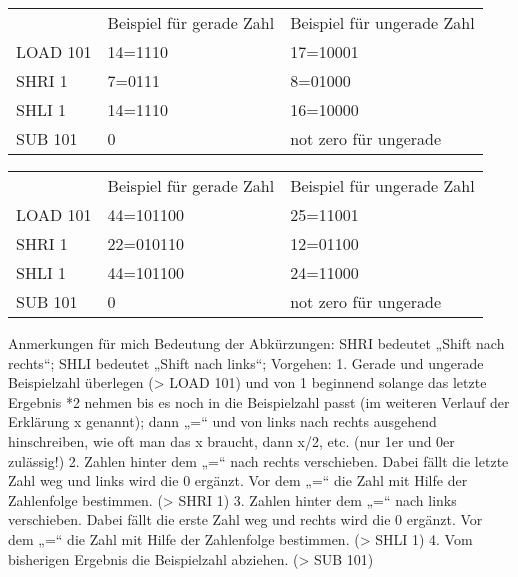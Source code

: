 \documentclass{lehramt-informatik-aufgabe}
\begin{document}
\begin{tabular}{lll}
         & Beispiel für gerade 			Zahl & Beispiel für ungerade 			Zahl \\
LOAD 101 & 14=1110                     & 17=10001                      \\
SHRI 1   & 7=0111                      & 8=01000                       \\
SHLI 1   & 14=1110                     & 16=10000                      \\
SUB 101  & 0                           & not zero 			für ungerade
\end{tabular}

\begin{tabular}{lll}
         & Beispiel für gerade 			Zahl & Beispiel für ungerade 			Zahl \\
LOAD 101 & 44=101100                   & 25=11001                      \\
SHRI 1   & 22=010110                   & 12=01100                      \\
SHLI 1   & 44=101100                   & 24=11000                      \\
SUB 101  & 0                           & not zero 			für ungerade
\end{tabular}

Anmerkungen für mich
Bedeutung der Abkürzungen:
SHRI bedeutet „Shift nach rechts“; SHLI bedeutet „Shift nach links“;
Vorgehen:
1. Gerade und ungerade Beispielzahl überlegen (> LOAD 101) und von 1 beginnend solange das letzte Ergebnis *2 nehmen bis es noch in die Beispielzahl passt (im weiteren Verlauf der Erklärung x genannt); dann „=“ und von links nach rechts ausgehend hinschreiben, wie oft man das x braucht, dann x/2, etc. (nur 1er und 0er zulässig!)
2. Zahlen hinter dem „=“ nach rechts verschieben. Dabei fällt die letzte Zahl weg und links wird die 0 ergänzt. Vor dem „=“ die Zahl mit Hilfe der Zahlenfolge bestimmen. (> SHRI 1)
3. Zahlen hinter dem „=“ nach links verschieben. Dabei fällt die erste Zahl weg und rechts wird die 0 ergänzt. Vor dem „=“ die Zahl mit Hilfe der Zahlenfolge bestimmen. (> SHLI 1)
4. Vom bisherigen Ergebnis die Beispielzahl abziehen. (> SUB 101)
\end{document}
